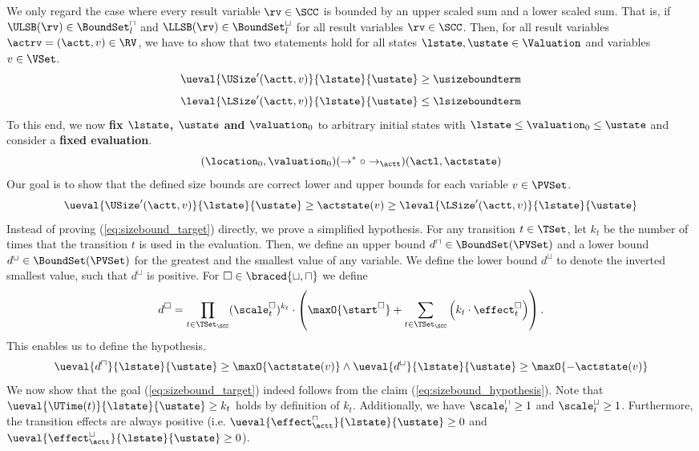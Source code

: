 We only regard the case where every result variable $\rv \in \SCC$ is bounded by an upper scaled sum and a lower scaled sum.
That is, if $\ULSB(\rv) \in \BoundSet^\sqcap_l$ and $\LLSB(\rv) \in \BoundSet^\sqcup_l$ for all result variables $\rv \in \SCC$.
Then, for all result variables $\actrv = (\actt, v) \in \RV$, we have to show that two statements hold for all states $\lstate, \ustate \in \Valuation$ and variables $v \in \VSet$.
\[ \ueval{\USize'(\actt, v)}{\lstate}{\ustate} \geq \usizeboundterm \]
\[ \leval{\LSize'(\actt, v)}{\lstate}{\ustate} \leq \lsizeboundterm \]
To this end, we now \textbf{fix $\lstate$, $\ustate$ and $\valuation_0$} to arbitrary initial states with $\lstate \leq \valuation_0 \leq \ustate$ and consider a \textbf{fixed evaluation}.
\[ (\location_0, \valuation_0) (\rightarrow^* \circ \rightarrow_\actt) (\actl, \actstate) \]
Our goal is to show that the defined size bounds are correct lower and upper bounds for each variable $v \in \PVSet$.
\begin{equation} \label{eq:sizebound_target}
  \ueval{\USize'(\actt, v)}{\lstate}{\ustate} \geq \actstate(v) \geq \leval{\LSize'(\actt, v)}{\lstate}{\ustate}
\end{equation}
Instead of proving (\ref{eq:sizebound_target}) directly, we prove a simplified hypothesis.
For any transition $t \in \TSet$, let $k_t$ be the number of times that the transition $t$ is used in the evaluation.
Then, we define an upper bound $d^\sqcap \in \BoundSet(\PVSet)$ and a lower bound $d^\sqcup \in \BoundSet(\PVSet)$ for the greatest and the smallest value of any variable.
We define the lower bound $d^\sqcup$ to denote the inverted smallest value, such that $d^\sqcup$ is positive.
For $\square \in \braced{\sqcup, \sqcap}$ we define
\[ d^\square = \prod_{t \in \TSet_\SCC} (\scale^\square_t)^{k_t} \cdot \left( \maxO{\start^\square} + \sum_{t \in \TSet_\SCC} \left( k_t \cdot \effect^\square_t \right) \right). \]
This enables us to define the hypothesis.
\begin{equation} \label{eq:sizebound_hypothesis}
  \ueval{d^\sqcap}{\lstate}{\ustate} \geq \maxO{\actstate(v)} \wedge \ueval{d^\sqcup}{\lstate}{\ustate} \geq \maxO{-\actstate(v)}
\end{equation}
We now show that the goal (\ref{eq:sizebound_target}) indeed follows from the claim (\ref{eq:sizebound_hypothesis}).
Note that $\ueval{\UTime(t)}{\lstate}{\ustate} \geq k_t$ holds by definition of $k_t$.
Additionally, we have $\scale^\sqcap_t \geq 1$ and $\scale^\sqcup_t \geq 1$.
Furthermore, the transition effects are always positive (i.e. $\ueval{\effect^\sqcap_\actt}{\lstate}{\ustate} \geq 0$ and $\ueval{\effect^\sqcup_\actt}{\lstate}{\ustate} \geq 0$).
